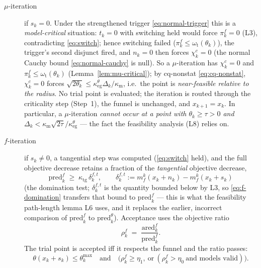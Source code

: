 \begin{description}
\item[$\mu$-iteration] if $s_k=0$. Under the strengthened trigger
  \eqref{eq:normal-trigger} this is a \emph{model-critical} situation:
  $t_k=0$ with switching held would force $\pi_k^f=0$ (L3), contradicting
  \eqref{eq:switch}; hence switching failed ($\pi_k^f\le\omega_{\mathrm t}(\theta_k)$),
  the trigger's second disjunct fired, and $n_k=0$ then forces $\chi_k^c=0$
  (the normal Cauchy bound \eqref{eq:normal-cauchy} is null). So a $\mu$-iteration
  has $\chi_k^c=0$ and $\pi_k^f\le\omega_{\mathrm t}(\theta_k)$
  (Lemma~\ref{lem:mu-critical}); by cq-nonstat \eqref{eq:cq-nonstat}, $\chi_k^c=0$
  forces $\sqrt{2\theta_k}\le\kappa_{\mathrm{eg}}^\theta\Delta_k/\kappa_{\mathrm m}$, i.e.\
  the point is \emph{near-feasible relative to the radius}. No trial point is
  evaluated; the iteration is routed through the criticality step (Step~1), the funnel
  is unchanged, and $x_{k+1}=x_k$. In particular, a $\mu$-iteration \emph{cannot occur
  at a point with $\theta_k\ge\tau>0$ and
  $\Delta_k<\kappa_{\mathrm m}\sqrt{2\tau}/\kappa_{\mathrm{eg}}^\theta$} --- the fact the
  feasibility analysis (L8) relies on.
\item[$f$-iteration] if $s_k\ne0$, a tangential step was computed
  (\eqref{eq:switch} held), and the full objective decrease retains a fraction of the
  \emph{tangential} objective decrease,
  \begin{equation}
    \label{eq:f-domination}
    \mathrm{pred}^f_k \;\ge\; \kappa_{\mathrm{tg}}\,\delta^{f,t}_k,
    \qquad \delta^{f,t}_k := m_f^k(x_k+n_k)-m_f^k(x_k+s_k)
  \end{equation}
  (the \citet[(2.33)]{GouldToint2010} domination test; $\delta^{f,t}_k$ is the
  quantity bounded below by L3, so \eqref{eq:f-domination} transfers that bound to
  $\mathrm{pred}^f_k$ --- this is what the feasibility path-length lemma L6 uses,
  and it replaces the earlier, incorrect comparison of $\mathrm{pred}^f_k$ to
  $\mathrm{pred}^\theta_k$). Acceptance uses the objective ratio
  \begin{equation}
    \label{eq:rhof}
    \rho^f_k \;=\; \frac{\mathrm{ared}^f_k}{\mathrm{pred}^f_k}.
  \end{equation}
  The trial point is accepted iff it respects the funnel and the ratio passes:
  \begin{equation}
    \label{eq:accept-f}
    \theta(x_k+s_k)\le\theta_k^{\max}
    \quad\text{and}\quad
    \bigl(\rho^f_k\ge\eta_1,\ \text{or}\ (\rho^f_k>\eta_0\ \text{and models valid})\bigr).

\end{equation}
\end{description}
